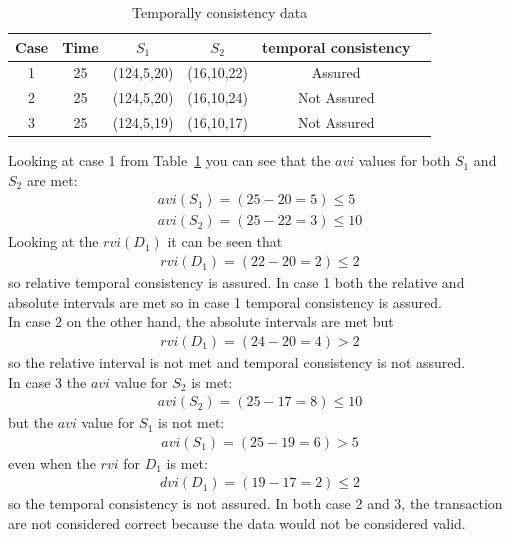 \documentclass[conference]{IEEEtran}
\begin{document}
\begin{table}[h] %
\begin{center}
\begin{tabular}{|c|c|c|c|c|c|}
\hline
Case & Time & $S_1$ & $S_2$ & temporal consistency\\
\hline
1& 25 & (124,5,20) & (16,10,22)& Assured\\
\hline
2& 25 & (124,5,20) & (16,10,24) & Not Assured\\
\hline
3&25&(124,5,19) & (16,10,17) & Not Assured\\
\hline
\end{tabular}
\end{center}
	\caption{Temporally consistency data}
	\label{tab:Example}
\end{table} 

\indent Looking at case 1 from Table~\ref{tab:Example} you can see that the $avi$ values for both $S_1$ and $S_2$ are met:
\begin{eqnarray}
avi(S_1) =(25-20=5)\leq 5 \\
avi(S_2)=(25-22=3) \leq 10
\end{eqnarray}
Looking at the $rvi(D_1)$ it can be seen that 
\begin{eqnarray}
rvi(D_1) = (22-20 = 2) \leq 2
\end{eqnarray}
 so relative temporal consistency is assured. In case 1 both the relative and absolute intervals are met so in case 1 temporal consistency is assured.
\\
\indent In case 2 on the other hand, the absolute intervals are met but 
\begin{eqnarray}
rvi(D_1) = (24-20 =4) > 2
\end{eqnarray} 
so the relative interval is not met and temporal consistency is not assured.\\
\indent In case 3 the $avi$ value for $S_2$ is met:
\begin{eqnarray}
avi(S_2) =(25-17=8)\leq 10
\end{eqnarray}
but the $avi$ value for $S_1$ is not met:
\begin{eqnarray}
avi(S_1) = (25-19=6)>5
\end{eqnarray}  
even when the $rvi$ for $D_1$ is met:
\begin{eqnarray}
dvi(D_1)=(19-17=2) \leq 2
\end{eqnarray}   so the temporal consistency is not assured. In both case 2 and 3, the transaction are not considered correct because the data would not be considered valid.
\end{document}
